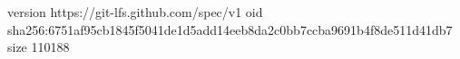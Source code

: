 version https://git-lfs.github.com/spec/v1
oid sha256:6751af95cb1845f5041de1d5add14eeb8da2c0bb7ccba9691b4f8de511d41db7
size 110188
